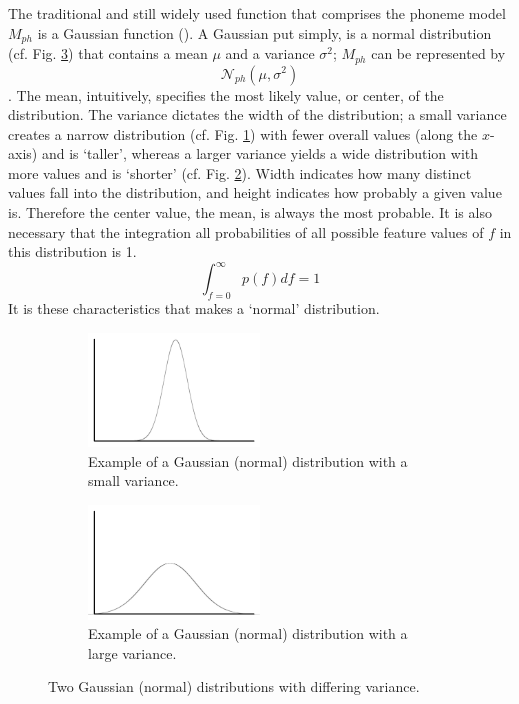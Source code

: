 The traditional and still widely used function that comprises the phoneme model $M_{ph}$ is a Gaussian function (\cite{gales:07}).  A Gaussian put simply, is a normal distribution (cf. Fig. \ref{fig:norm-dist}) that contains a mean $\mu$ and a variance $\sigma^2$; $M_{ph}$ can be represented by \begin{equation} \mathcal{N}_{ph}(\mu,\sigma^2) \end{equation}.  The mean, intuitively, specifies the most likely value, or center, of the distribution.  The variance dictates the width of the distribution; a small variance creates a narrow distribution (cf. Fig. \ref{fig:norm-narrow}) with fewer overall values (along the $x$-axis) and is `taller', whereas a larger variance yields a wide distribution with more values and is `shorter' (cf. Fig. \ref{fig:norm-wide}).  Width indicates how many distinct values fall into the distribution, and height indicates how probably a given value is.  Therefore the center value, the mean, is always the most probable.  It is also necessary that the integration all probabilities of all possible feature values of $f$ in this distribution is 1. \begin{equation} \int_{f=0}^\infty p(f) df = 1 \end{equation}  It is these characteristics that makes a `normal' distribution.  
%
\begin{figure}[H!]
\centering
\begin{subfigure}[c!]{0.5\textwidth}
\centering
\includegraphics[width=0.5\textwidth]{figure/norm-narrow.png}
\caption{Example of a Gaussian (normal) distribution with a small variance.}\label{fig:norm-narrow}
\end{subfigure}
\qquad
\begin{subfigure}[c!]{0.5\textwidth}
\centering
\includegraphics[width=0.5\textwidth]{figure/norm-wide.png}
\caption{Example of a Gaussian (normal) distribution with a large variance.}\label{fig:norm-wide}
\end{subfigure}
\caption{Two Gaussian (normal) distributions with differing variance.}\label{fig:norm-dist}
\end{figure}


